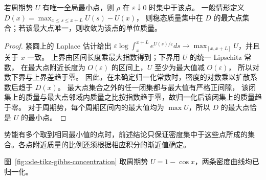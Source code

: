\begin{proposition}[小扩散极限]
若周期势 $U$ 有唯一全局最小点，则 $\rho$ 在 $\varepsilon\downarrow0$ 时集中于该点。
一般情形定义
$D(x)=\max_{x\leq s\leq x+L}U(s)-U(x)$，
则稳态质量集中在 $D$ 的最大点集合；若该最大点唯一，则收敛为该点的单位质量。
\end{proposition}
\begin{proof}
紧圆上的 Laplace 估计给出
$\varepsilon\log\displaystyle\int_x^{x+L}e^{U(s)/\varepsilon}ds
\to\max_{[x,x+L]}U$，并且关于 $x$ 一致。
上界由区间长度乘最大指数得到；下界用 $U$ 的统一 Lipschitz 常数，
在最大点附近长度为 $O(\varepsilon)$ 的区间上，$U$ 至少为最大值减 $O(\varepsilon)$，
所以对数下界与上界差趋于零。
因此，在未确定归一化常数时，密度的对数乘以扩散系数后趋于 $D(x)$。
最大点集合之外的任一闭集都与最大值有严格正间隙，
该闭集上的质量与最大点邻域内质量之比按指数趋于零，故归一化后该闭集上的质量趋于零。
对于周期势，每个周期区间内的最大值均为 $\max U$，所以 $D$ 的最大点恰是 $U$ 的最小点。
\end{proof}
势能有多个取到相同最小值的点时，前述结论只保证密度集中于这些点所成的集合。各点附近质量的比例还须根据相应积分的渐近值确定。

图~\ref{fig:ode-tikz-gibbs-concentration} 取周期势 $U=1-\cos x$，两条密度曲线均已归一化。
\begin{center}
\begin{minipage}{0.96\linewidth}
\centering
\label{fig:ode-tikz-gibbs-concentration}
\end{minipage}
\end{center}

